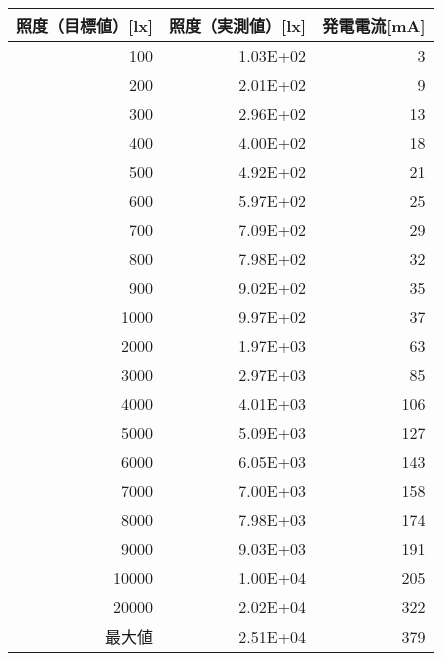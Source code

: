 \begin{tabular}{@{}rrr@{}}
  \toprule
  \multicolumn{1}{c}{照度（目標値）{[}lx{]}} & \multicolumn{1}{c}{照度（実測値）{[}lx{]}} & \multicolumn{1}{c}{発電電流{[}mA{]}} \\ \midrule
  100    & 1.03E+02 & 3  \\
  200    & 2.01E+02 & 9  \\
  300    & 2.96E+02 & 13 \\
  400    & 4.00E+02 & 18 \\
  500    & 4.92E+02 & 21 \\
  600    & 5.97E+02 & 25 \\
  700    & 7.09E+02 & 29 \\
  800    & 7.98E+02 & 32 \\
  900    & 9.02E+02 & 35 \\
  1000   & 9.97E+02 & 37 \\
  2000   & 1.97E+03 & 63 \\
  3000   & 2.97E+03 & 85 \\
  4000   & 4.01E+03 & 106\\
  5000   & 5.09E+03 & 127\\
  6000   & 6.05E+03 & 143\\
  7000   & 7.00E+03 & 158\\
  8000   & 7.98E+03 & 174\\
  9000   & 9.03E+03 & 191\\
  10000  & 1.00E+04 & 205\\
  20000  & 2.02E+04 & 322\\
  最大値 & 2.51E+04 & 379\\ \bottomrule
\end{tabular}